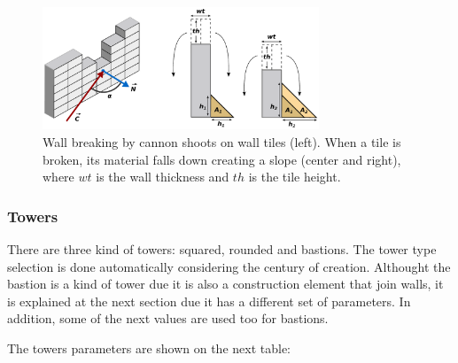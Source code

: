 \documentclass[tog]{acmsiggraph}
\begin{document}
\begin{figure}[ht]
  \centering
  \includegraphics[width=3.25in]{figs/wallbreak}
  \caption{Wall breaking by cannon shoots on wall tiles (left). When a tile is broken, its material falls down creating a slope (center and right), where $wt$ is the wall thickness and $th$ is the tile height.}
  \label{fig:wallbreak}
\end{figure}



\subsubsection{Towers}
\label{sec:settingscastletower}

There are three kind of towers: squared, rounded and bastions.
The tower type selection is done automatically considering the century of creation.
Althought the bastion is a kind of tower due it is also a construction element that join walls, it is explained at the next section due it has a different set of parameters.
In addition, some of the next values are used too for bastions.

The towers parameters are shown on the next table:
\end{document}

